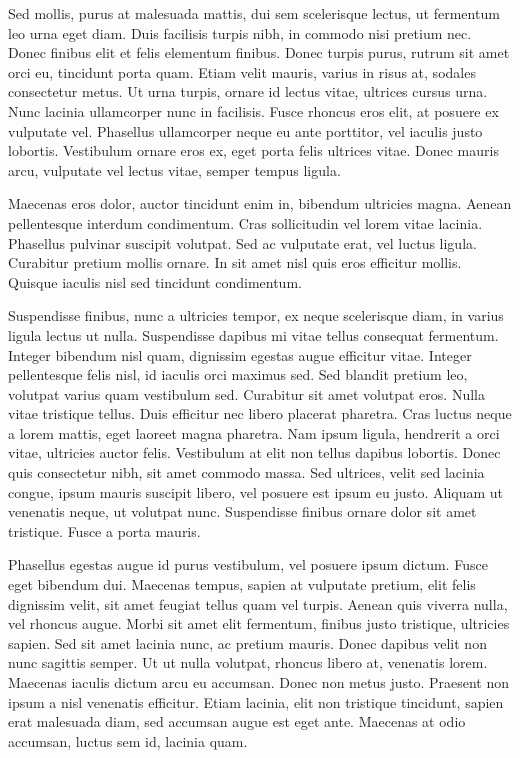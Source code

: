 Sed mollis, purus at malesuada mattis, dui sem scelerisque lectus, ut fermentum leo urna eget diam. Duis facilisis turpis nibh, in commodo nisi pretium nec. Donec finibus elit et felis elementum finibus. Donec turpis purus, rutrum sit amet orci eu, tincidunt porta quam. Etiam velit mauris, varius in risus at, sodales consectetur metus. Ut urna turpis, ornare id lectus vitae, ultrices cursus urna. Nunc lacinia ullamcorper nunc in facilisis. Fusce rhoncus eros elit, at posuere ex vulputate vel. Phasellus ullamcorper neque eu ante porttitor, vel iaculis justo lobortis. Vestibulum ornare eros ex, eget porta felis ultrices vitae. Donec mauris arcu, vulputate vel lectus vitae, semper tempus ligula.

Maecenas eros dolor, auctor tincidunt enim in, bibendum ultricies magna. Aenean pellentesque interdum condimentum. Cras sollicitudin vel lorem vitae lacinia. Phasellus pulvinar suscipit volutpat. Sed ac vulputate erat, vel luctus ligula. Curabitur pretium mollis ornare. In sit amet nisl quis eros efficitur mollis. Quisque iaculis nisl sed tincidunt condimentum.

Suspendisse finibus, nunc a ultricies tempor, ex neque scelerisque diam, in varius ligula lectus ut nulla. Suspendisse dapibus mi vitae tellus consequat fermentum. Integer bibendum nisl quam, dignissim egestas augue efficitur vitae. Integer pellentesque felis nisl, id iaculis orci maximus sed. Sed blandit pretium leo, volutpat varius quam vestibulum sed. Curabitur sit amet volutpat eros. Nulla vitae tristique tellus. Duis efficitur nec libero placerat pharetra. Cras luctus neque a lorem mattis, eget laoreet magna pharetra. Nam ipsum ligula, hendrerit a orci vitae, ultricies auctor felis. Vestibulum at elit non tellus dapibus lobortis. Donec quis consectetur nibh, sit amet commodo massa. Sed ultrices, velit sed lacinia congue, ipsum mauris suscipit libero, vel posuere est ipsum eu justo. Aliquam ut venenatis neque, ut volutpat nunc. Suspendisse finibus ornare dolor sit amet tristique. Fusce a porta mauris.

Phasellus egestas augue id purus vestibulum, vel posuere ipsum dictum. Fusce eget bibendum dui. Maecenas tempus, sapien at vulputate pretium, elit felis dignissim velit, sit amet feugiat tellus quam vel turpis. Aenean quis viverra nulla, vel rhoncus augue. Morbi sit amet elit fermentum, finibus justo tristique, ultricies sapien. Sed sit amet lacinia nunc, ac pretium mauris. Donec dapibus velit non nunc sagittis semper. Ut ut nulla volutpat, rhoncus libero at, venenatis lorem. Maecenas iaculis dictum arcu eu accumsan. Donec non metus justo. Praesent non ipsum a nisl venenatis efficitur. Etiam lacinia, elit non tristique tincidunt, sapien erat malesuada diam, sed accumsan augue est eget ante. Maecenas at odio accumsan, luctus sem id, lacinia quam.

